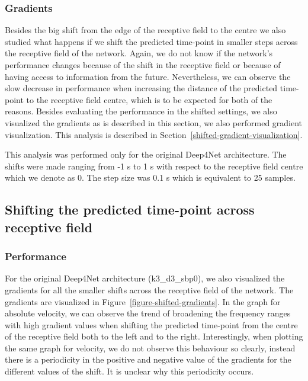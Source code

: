 \subsubsection{Gradients}
Besides the big shift from the edge of the receptive field to the centre we also studied what happens if we shift the predicted time-point in smaller steps across the receptive field of the network.
Again, we do not know if the network's performance changes because of the shift in the receptive field or because of having access to information from the future.
Nevertheless, we can observe the slow decrease in performance when increasing the distance of the predicted time-point to the receptive field centre, which is to be expected for both of the reasons.
Besides evaluating the performance in the shifted settings, we also visualized the gradients as is described in this section, we also performed gradient visualization.
This analysis is described in Section~\ref{shifted-gradient-visualization}.

This analysis was performed only for the original Deep4Net architecture.
The shifts were made ranging from  -1 s  to 1 s with respect to the receptive field centre which we denote as 0.
The step size was 0.1 s which is equivalent to 25 samples.

\subsection{Shifting the predicted time-point across receptive field}\label{subsec:shifting-the-predicted-time-point-across-receptive-field}
\subsubsection{Performance}
For the original Deep4Net architecture (k3\_d3\_sbp0), we also visualized the gradients for all the smaller shifts across the receptive field of the network.
The gradients are visualized in Figure~\ref{figure-shifted-gradients}.
In the graph for absolute velocity, we can observe the trend of broadening the frequency ranges with high gradient values when shifting the predicted time-point from the centre of the receptive field both to the left and to the right.
Interestingly, when plotting the same graph for velocity, we do not observe this behaviour so clearly, instead there is a periodicity in the positive and negative value of the gradients for the different values of the shift.
It is unclear why this periodicity occurs.
